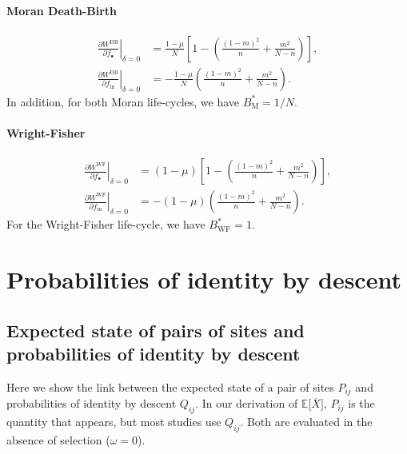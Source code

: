 \documentclass[11pt, letterpaper]{article}
\newcommand{\deriv}[2]{\partial_{#2}\!{#1}\,}
\newcommand{\derivv}[3]{\left.\frac{\partial #1}{\partial #2}\right |_{#3=0}} %
\newcommand{\Esp}[1]{\mathbb{E}\big[ #1\big]}%
\newcommand{\Moran}{\textrm{M}}
\newcommand{\DB}{\textrm{DB}}
\newcommand{\WF}{\textrm{WF}}
\newcommand{\inn}{\textrm{in}}
\newcommand{\focal}{\bullet}
\begin{document}
\paragraph{Moran Death-Birth}
\begin{subequations}\label{eq:dWDB}
\begin{align}
\derivv{W^{\DB}}{f_{\focal}}{\delta} &= \frac{1-\mu}{N} \left[ 1 - \left( \frac{(1-m)^2}{n} + \frac{m^2}{N-n}  \right) \right],\\
\derivv{W^{\DB}}{f_{\inn}}{\delta} &= - \frac{1-\mu}{N} \left( \frac{(1-m)^2}{n} + \frac{m^2}{N-n}  \right). 
\end{align}
\end{subequations}
%
In addition, for both Moran life-cycles, we have $B^{*}_\Moran = 1/N$.
\paragraph{Wright-Fisher}
\begin{subequations}\label{eq:dWWF}
\begin{align}
\derivv{W^{\WF}}{f_{\focal}}{\delta} &= (1-\mu) \left[ 1 - \left( \frac{(1-m)^2}{n} + \frac{m^2}{N-n}  \right) \right],\\
\derivv{W^{\WF}}{f_{\inn}}{\delta} &= - (1-\mu) \left( \frac{(1-m)^2}{n} + \frac{m^2}{N-n}  \right). 
\end{align}
\end{subequations}
For the Wright-Fisher life-cycle, we have $B^*_{\WF} = 1$.

\clearpage

\section{Probabilities of identity by descent}
\subsection{Expected state of pairs of sites and probabilities of identity by descent\label{sec:app:IBD}}

Here we show the link between the expected state of a pair of sites $P_{ij}$ and probabilities of identity by descent $Q_{ij}$. In our derivation of $\Esp{\overline{X}}$, $P_{ij}$ is the quantity that appears, but most studies use $Q_{ij}$. Both are evaluated in the absence of selection ($\omega = 0$). 
\end{document}
